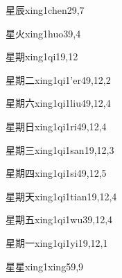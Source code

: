 \begin{verbete}{星辰}{xing1chen2}{9,7}
\end{verbete}

\begin{verbete}{星火}{xing1huo3}{9,4}
\end{verbete}

\begin{verbete}{星期}{xing1qi1}{9,12}
\end{verbete}

\begin{verbete}{星期二}{xing1qi1'er4}{9,12,2}
\end{verbete}

\begin{verbete}{星期六}{xing1qi1liu4}{9,12,4}
\end{verbete}

\begin{verbete}{星期日}{xing1qi1ri4}{9,12,4}
\end{verbete}

\begin{verbete}{星期三}{xing1qi1san1}{9,12,3}
\end{verbete}

\begin{verbete}{星期四}{xing1qi1si4}{9,12,5}
\end{verbete}

\begin{verbete}{星期天}{xing1qi1tian1}{9,12,4}
\end{verbete}

\begin{verbete}{星期五}{xing1qi1wu3}{9,12,4}
\end{verbete}

\begin{verbete}{星期一}{xing1qi1yi1}{9,12,1}
\end{verbete}

\begin{verbete}{星星}{xing1xing5}{9,9}
\end{verbete}

